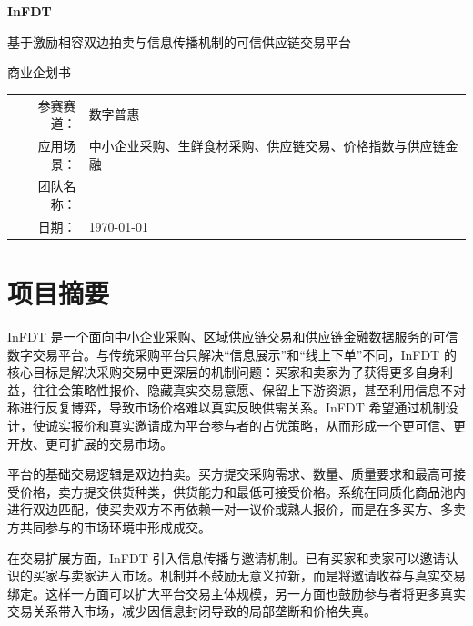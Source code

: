 \documentclass[UTF8,11pt]{ctexart}
\begin{document}
\begin{titlepage}
    \centering
    \vspace*{2.5cm}

    {\Huge \bfseries InFDT\par}
    \vspace{0.6cm}
    {\Large 基于激励相容双边拍卖与信息传播机制的可信供应链交易平台\par}

    \vspace{2.5cm}

    {\Large 商业企划书\par}

    \vfill

    \begin{tabular}{rl}
        参赛赛道： & 数字普惠                           \\
        应用场景： & 中小企业采购、生鲜食材采购、供应链交易、价格指数与供应链金融 \\
        团队名称： & \underline{\hspace{6cm}}       \\
        日期：   & \today
    \end{tabular}

    \vspace*{2cm}
\end{titlepage}

\tableofcontents
\newpage


\section{项目摘要}

InFDT 是一个面向中小企业采购、区域供应链交易和供应链金融数据服务的可信数字交易平台。与传统采购平台只解决“信息展示”和“线上下单”不同，InFDT 的核心目标是解决采购交易中更深层的机制问题：买家和卖家为了获得更多自身利益，往往会策略性报价、隐藏真实交易意愿、保留上下游资源，甚至利用信息不对称进行反复博弈，导致市场价格难以真实反映供需关系。InFDT 希望通过机制设计，使诚实报价和真实邀请成为平台参与者的占优策略，从而形成一个更可信、更开放、更可扩展的交易市场。

平台的基础交易逻辑是双边拍卖。买方提交采购需求、数量、质量要求和最高可接受价格，卖方提交供货种类，供货能力和最低可接受价格。系统在同质化商品池内进行双边匹配，使买卖双方不再依赖一对一议价或熟人报价，而是在多买方、多卖方共同参与的市场环境中形成成交。

在交易扩展方面，InFDT 引入信息传播与邀请机制。已有买家和卖家可以邀请认识的买家与卖家进入市场。机制并不鼓励无意义拉新，而是将邀请收益与真实交易绑定。这样一方面可以扩大平台交易主体规模，另一方面也鼓励参与者将更多真实交易关系带入市场，减少因信息封闭导致的局部垄断和价格失真。
\end{document}
